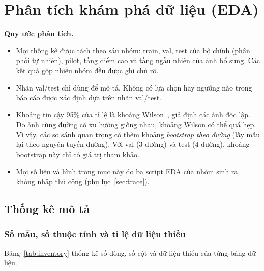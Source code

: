 \needspace{0.3\textheight}
\section{Phân tích khám phá dữ liệu (EDA)}
\label{sec:eda}

\textbf{Quy ước phân tích.}
\begin{itemize}
  \item Mọi thống kê được tách theo sáu nhóm: train, val, test của bộ chính (phân phối tự nhiên), pilot, tầng điểm cao và tầng ngẫu nhiên của ảnh bổ sung. Các kết quả gộp nhiều nhóm đều được ghi chú rõ.
  \item Nhãn val/test chỉ dùng để mô tả. Không có lựa chọn hay ngưỡng nào trong báo cáo được xác định dựa trên nhãn val/test.
  \item Khoảng tin cậy 95\% của tỉ lệ là khoảng Wilson~\cite{wilson1927interval}, giả định các ảnh độc lập. Do ảnh cùng đường có xu hướng giống nhau, khoảng Wilson có thể quá hẹp. Vì vậy, các so sánh quan trọng có thêm khoảng \emph{bootstrap theo đường} (lấy mẫu lại theo nguyên tuyến đường). Với val (3 đường) và test (4 đường), khoảng bootstrap này chỉ có giá trị tham khảo.
  \item Mọi số liệu và hình trong mục này do ba script EDA của nhóm sinh ra, không nhập thủ công (phụ lục~\ref{sec:trace}).
\end{itemize}

\subsection{Thống kê mô tả}
\label{sec:eda-desc}

\subsubsection*{Số mẫu, số thuộc tính và tỉ lệ dữ liệu thiếu}

Bảng~\ref{tab:inventory} thống kê số dòng, số cột và dữ liệu thiếu của từng bảng dữ liệu.

